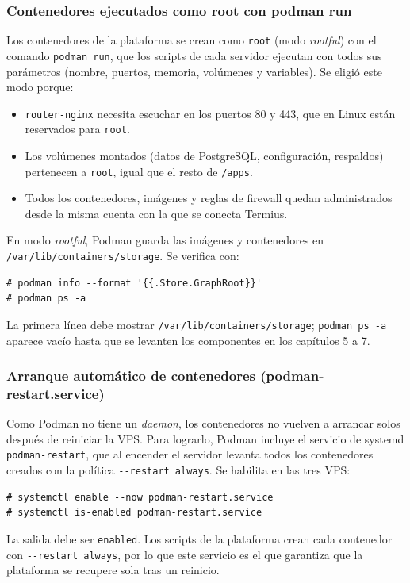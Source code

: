 \subsubsection{Contenedores ejecutados como root con podman run}
Los contenedores de la plataforma se crean como \texttt{root} (modo \emph{rootful}) con el comando \texttt{podman run}, que los scripts de cada servidor ejecutan con todos sus parámetros (nombre, puertos, memoria, volúmenes y variables). Se eligió este modo porque:
\begin{itemize}
  \item \texttt{router-nginx} necesita escuchar en los puertos 80 y 443, que en Linux están reservados para \texttt{root}.
  \item Los volúmenes montados (datos de PostgreSQL, configuración, respaldos) pertenecen a \texttt{root}, igual que el resto de \texttt{/apps}.
  \item Todos los contenedores, imágenes y reglas de firewall quedan administrados desde la misma cuenta con la que se conecta Termius.
\end{itemize}
En modo \emph{rootful}, Podman guarda las imágenes y contenedores en \texttt{/var/lib/containers/storage}. Se verifica con:
\begin{lstlisting}
# podman info --format '{{.Store.GraphRoot}}'
# podman ps -a
\end{lstlisting}
La primera línea debe mostrar \texttt{/var/lib/containers/storage}; \texttt{podman ps -a} aparece vacío hasta que se levanten los componentes en los capítulos 5 a 7.

\subsubsection{Arranque automático de contenedores (podman-restart.service)}
Como Podman no tiene un \emph{daemon}, los contenedores no vuelven a arrancar solos después de reiniciar la VPS. Para lograrlo, Podman incluye el servicio de systemd \texttt{podman-restart}, que al encender el servidor levanta todos los contenedores creados con la política \texttt{-{}-restart always}. Se habilita en las tres VPS:
\begin{lstlisting}
# systemctl enable --now podman-restart.service
# systemctl is-enabled podman-restart.service
\end{lstlisting}
La salida debe ser \texttt{enabled}. Los scripts de la plataforma crean cada contenedor con \texttt{-{}-restart always}, por lo que este servicio es el que garantiza que la plataforma se recupere sola tras un reinicio.
